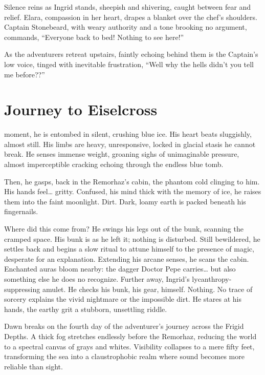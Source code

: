 \documentclass[
  letterpaper,12pt,twoside,twocolumn,openany,
  nodeprecatedcode,bg=full]{dndbook}
\begin{document}
Silence reins as Ingrid stands, sheepish and shivering, caught between
fear and relief. Elara, compassion in her heart, drapes a blanket over
the chef's shoulders. Captain Stonebeard, with weary authority and a
tone brooking no argument, commands, ``Everyone back to bed! Nothing to
see here!''

As the adventurers retreat upstairs, faintly echoing behind them is the
Captain's low voice, tinged with inevitable frustration, ``Well why the
hells didn't you tell me before??''

\chapter{Journey to Eiselcross}\label{journey-to-eiselcross}

 moment, he is entombed in
silent, crushing blue ice. His heart beats sluggishly, almost still. His
limbs are heavy, unresponsive, locked in glacial stasis he cannot break.
He senses immense weight, groaning sighs of unimaginable pressure,
almost imperceptible cracking echoing through the endless blue tomb.

Then, he gasps, back in the Remorhaz's cabin, the phantom cold clinging
to him. His hands feel\ldots{} gritty. Confused, his mind thick with the
memory of ice, he raises them into the faint moonlight. Dirt. Dark,
loamy earth is packed beneath his fingernails.

Where did this come from? He swings his legs out of the bunk, scanning
the cramped space. His bunk is as he left it; nothing is disturbed.
Still bewildered, he settles back and begins a slow ritual to attune
himself to the presence of magic, desperate for an explanation.
Extending his arcane senses, he scans the cabin. Enchanted auras bloom
nearby: the dagger Doctor Pepe carries\ldots{} but also something else
he does no recognize. Further away, Ingrid's lycanthropy-suppressing
amulet. He checks his bunk, his gear, himself. Nothing. No trace of
sorcery explains the vivid nightmare or the impossible dirt. He stares
at his hands, the earthy grit a stubborn, unsettling riddle.

Dawn breaks on the fourth day of the adventurer's journey across the
Frigid Depths. A thick fog stretches endlessly before the Remorhaz,
reducing the world to a spectral canvas of grays and whites. Visibility
collapses to a mere fifty feet, transforming the sea into a
claustrophobic realm where sound becomes more reliable than sight.
\end{document}
